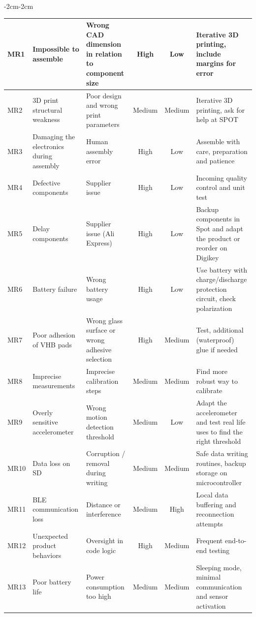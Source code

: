 \documentclass{article}
\begin{document}
\begin{adjustwidth}{-2cm}{-2cm}
\begin{longtable}{|p{1cm}|p{3.2cm}|p{4cm}|c|c|p{4cm}|}
MR1 & Impossible to assemble & Wrong CAD dimension in relation to component size & High & Low & Iterative 3D printing, include margins for error \\ \hline
MR2 & 3D print structural weakness & Poor design and wrong print parameters & Medium & Medium & Iterative 3D printing, ask for help at SPOT \\ \hline
MR3 & Damaging the electronics during assembly & Human assembly error & High & Low & Assemble with care, preparation and patience \\ \hline
MR4 & Defective components & Supplier issue & High & Low & Incoming quality control and unit test \\ \hline
MR5 & Delay components & Supplier issue (Ali Express) & High & Low & Backup components in Spot and adapt the product or reorder on Digikey \\ \hline
MR6 & Battery failure & Wrong battery usage & High & Low & Use battery with charge/discharge protection circuit, check polarization \\ \hline
MR7 & Poor adhesion of VHB pads & Wrong glass surface or wrong adhesive selection & High & Medium & Test, additional (waterproof) glue if needed \\ \hline
MR8 & Imprecise measurements & Imprecise calibration steps & Medium & Medium & Find more robust way to calibrate \\ \hline
MR9 & Overly sensitive accelerometer & Wrong motion detection threshold & Medium & Low & Adapt the accelerometer and test real life uses to find the right threshold \\ \hline
MR10 & Data loss on SD & Corruption / removal during writing & Medium & Medium & Safe data writing routines, backup storage on microcontroller \\ \hline
MR11 & BLE communication loss & Distance or interference & Medium & High & Local data buffering and reconnection attempts \\ \hline
MR12 & Unexpected product behaviors & Oversight in code logic & High & Medium & Frequent end-to-end testing \\ \hline
MR13 & Poor battery life & Power consumption too high & Medium & Medium & Sleeping mode, minimal communication and sensor activation \\ \hline



\end{longtable}
\end{adjustwidth}
\end{document}
